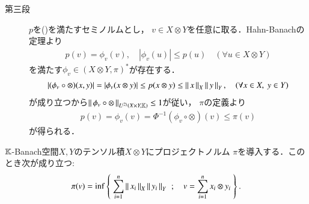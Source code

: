 \begin{prf}
\begin{description}
			\item[第三段]
				$p$を()を満たすセミノルムとし，
				$v \in X \otimes Y$を任意に取る．Hahn-Banachの定理より
				\begin{align}
					p(v) = \phi_v(v),
					\quad |\phi_v(u)| \leq p(u)
					\quad (\forall u \in X \otimes Y)
				\end{align}
				を満たす$\phi_v \in (X \otimes Y,\pi)^*$が存在する．
				\begin{align}
					\left| (\phi_v \circ \otimes)(x,y) \right|
					= \left|\phi_v(x \otimes y)\right| 
					\leq p(x \otimes y)
					\leq \Norm{x}{X} \Norm{y}{Y},
					\quad (\forall x \in X,\ y \in Y)
				\end{align}
				が成り立つから$\Norm{\phi_v \circ \otimes}{\ContLn{X \times Y}{\K}{2}} \leq 1$が従い，
				$\pi$の定義より
				\begin{align}
					p(v) = \phi_v(v) = \Phi^{-1}(\phi_v \circ \otimes)(v)
					\leq \pi(v)
				\end{align}
				が得られる．
				\QED
		\end{description}
	\end{prf}
	
	\begin{screen}
		\begin{thm}
			$\K$-Banach空間$X,Y$のテンソル積$X \otimes Y$にプロジェクトノルム
			$\pi$を導入する．このとき次が成り立つ:
			\begin{align}
				\pi(v) = \inf{}{\Set{\sum_{i=1}^n \Norm{x_i}{X}\Norm{y_i}{Y}}{
					v = \sum_{i=1}^n x_i \otimes y_i}}.
			\end{align}
		\end{thm}
	\end{screen}
	
